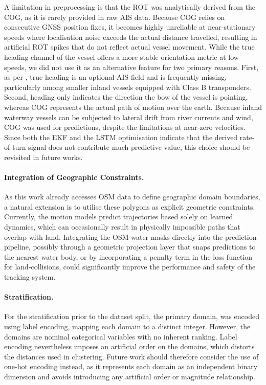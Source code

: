 A limitation in preprocessing is that the \ac{ROT} was analytically derived from the \ac{COG}, as it is rarely provided in raw \ac{AIS} data. Because \ac{COG} relies on consecutive \ac{GNSS} position fixes, it becomes highly unreliable at near-stationary speeds where localisation noise exceeds the actual distance travelled, resulting in artificial \ac{ROT} spikes that do not reflect actual vessel movement.
While the true heading channel of the vessel offers a more stable orientation metric at low speeds, we did not use it as an alternative feature for two primary reasons. First, as per \textcite{itu-r-m1371-1-2001}, true heading is an optional \ac{AIS} field and is frequently missing, particularly among smaller inland vessels equipped with Class B transponders. Second, heading only indicates the direction the bow of the vessel is pointing, whereas \ac{COG} represents the actual path of motion over the earth. Because inland waterway vessels can be subjected to lateral drift from river currents and wind, \ac{COG} was used for predictions, despite the %
limitations at near-zero velocities. %
Since both the \ac{EKF} and the \ac{LSTM} optimisation indicate that the derived rate-of-turn signal does not contribute much predictive value, this choice should be revisited in future works.

\paragraph{Integration of Geographic Constraints.}
As this work already accesses \ac{OSM} data to define geographic domain boundaries, a natural extension is to utilise these polygons as explicit geometric constraints. Currently, the motion models predict trajectories based solely on learned dynamics, which can occasionally result in physically impossible paths that overlap with land. Integrating the \ac{OSM} water masks directly into the prediction pipeline, possibly through a geometric projection layer that snaps predictions to the nearest water body, or by incorporating a penalty term in the loss function for land-collisions, could significantly improve the performance and safety of the tracking system.

\paragraph{Stratification.} 
For the stratification prior to the dataset split, the primary domain, was encoded using label encoding, mapping each domain to a distinct integer. However, the domains are nominal categorical variables with no inherent ranking. Label encoding nevertheless imposes an artificial order on the domains, which distorts the distances used in clustering. Future work should therefore consider the use of one-hot encoding instead, as it represents each domain as an independent binary dimension and avoids introducing any artificial order or magnitude relationship.


